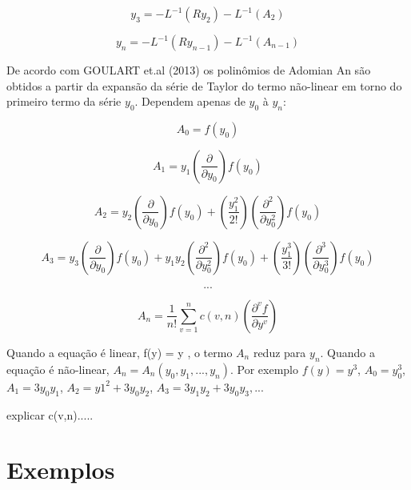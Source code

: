  \begin{equation}y_{3} = -L^{-1} (Ry_{2}) - L^{-1}(A_{2})
 \end{equation}
 
 \begin{equation}y_{n} = -L^{-1} (Ry_{n-1}) - L^{-1}(A_{n-1})
 \end{equation}
 
  De acordo com GOULART et.al (2013) os polinômios de Adomian An são obtidos a partir da expansão da série de Taylor do termo não-linear em torno do primeiro termo da série $y_{0}$. Dependem apenas de $y_{0}$ à $y_{n}$:
  
  \begin{equation}
  A_{0} = f(y_{0})
  \end{equation}
  
   \begin{equation}
  A_{1} = y_{1}\left(\dfrac{\partial }{\partial y_{0}}\right) f(y_{0})
  \end{equation}
  
  \begin{equation}
  A_{2} = y_{2} \left(\dfrac{\partial }{\partial y_{0}}\right)f(y_{0}) +\left(\dfrac{y_{1}^2}{2!}\right)\left(\dfrac{\partial^2 }{\partial y_{0}^2}\right)f(y_{0})
  \end{equation}
 
   \begin{equation}
  A_{3} = y_{3} \left(\dfrac{\partial }{\partial y_{0}}\right)f(y_{0}) + y_{1}y_{2}\left(\dfrac{\partial^2 }{\partial y_{0}^2}\right)f(y_{0}) + \left(\dfrac{y_{1}^3}{3!}\right)\left(\dfrac{\partial^3 }{\partial y_{0}^3}\right)f(y_{0})
  \end{equation}
  
 \begin{equation}
 ...
 \end{equation}
 
 \begin{equation}
  A_{n} = \dfrac{1}{n!} \sum_{v=1}^{n} c(v,n)\left(\dfrac{\partial^vf }{\partial y^v}\right)
 \end{equation}
  
  Quando a equação é linear, f(y) = y , o termo $A_{n}$ reduz para $y_{n}$. Quando a equação é não-linear, $A_{n} = A_{n} (y_{0}, y_{1},...,y_{n})$. Por exemplo $f(y) = y^3$, $A_{0} = y_{0}^3$, $A_{1} = 3y_{0}y_{1}$, $A_{2} = y1^2+3y_{0}y_{2}$, $A_{3} = 3y_{1}y_{2} + 3y_{0}y_{3},...$
  
  explicar c(v,n).....
 
 
 \section{Exemplos}
 
